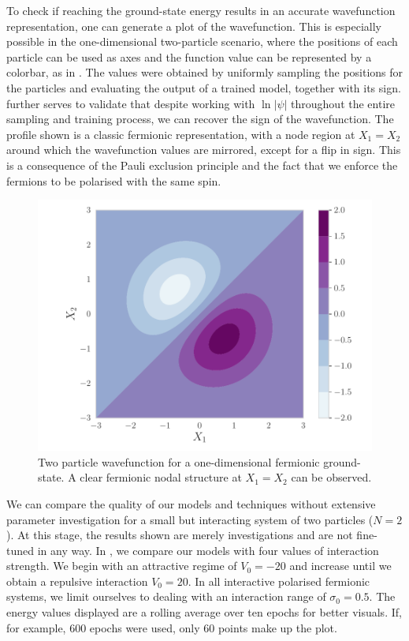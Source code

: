 To check if reaching the ground-state energy results in an accurate wavefunction representation, one can generate a plot of the wavefunction. This is especially possible in the one-dimensional two-particle scenario, where the positions of each particle can be used as axes and the function value can be represented by a colorbar, as in . The values were obtained by uniformly sampling the positions for the particles and evaluating the output of a trained model, together with its sign.  further serves to validate that despite working with $\ln|\psi|$ throughout the entire sampling and training process, we can recover the sign of the wavefunction. The profile shown is a classic fermionic representation, with a node region at $X_1 = X_2$ around which the wavefunction values are mirrored, except for a flip in sign. This is a consequence of the Pauli exclusion principle and the fact that we enforce the fermions to be polarised with the same spin.

\begin{figure}[H]
    \centering
    \includegraphics[width=0.7\linewidth]{Chapters/Results/N2/1D2P_wave_function.pdf}
    \caption{Two particle wavefunction for a one-dimensional fermionic ground-state. A clear fermionic nodal structure at $X_1 = X_2$ can be observed.}
    \label{fig:1D2P}
\end{figure}

We can compare the quality of our models and techniques without extensive parameter investigation for a small but interacting system of two particles ($N = 2$). At this stage, the results shown are merely investigations and are not fine-tuned in any way. In , we compare our models with four values of interaction strength. We begin with an attractive regime of $V_0 = - 20$ and increase until we obtain a repulsive interaction $V_0 = 20$. In all interactive polarised fermionic systems, we limit ourselves to dealing with an interaction range of $\sigma_0 = 0.5$. The energy values displayed are a rolling average over ten epochs for better visuals. If, for example, 600 epochs were used, only 60 points make up the plot. 

